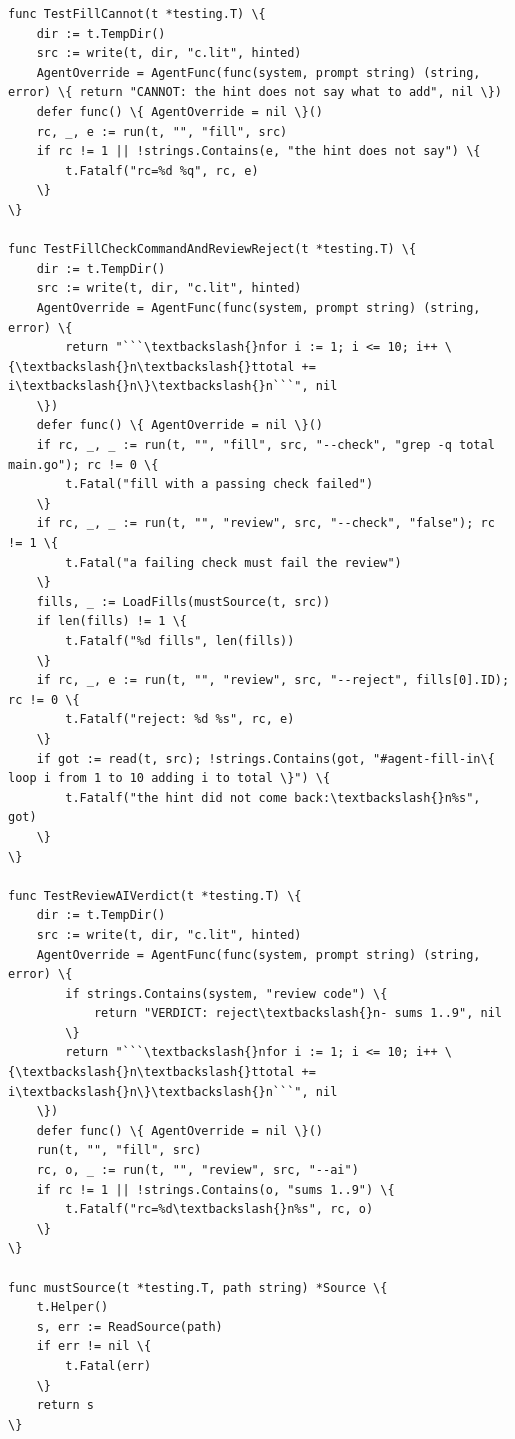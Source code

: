\documentclass[10pt,a4paper]{article}
\begin{document}
\begin{Verbatim}
func TestFillCannot(t *testing.T) \{
	dir := t.TempDir()
	src := write(t, dir, "c.lit", hinted)
	AgentOverride = AgentFunc(func(system, prompt string) (string, error) \{ return "CANNOT: the hint does not say what to add", nil \})
	defer func() \{ AgentOverride = nil \}()
	rc, _, e := run(t, "", "fill", src)
	if rc != 1 || !strings.Contains(e, "the hint does not say") \{
		t.Fatalf("rc=%d %q", rc, e)
	\}
\}

func TestFillCheckCommandAndReviewReject(t *testing.T) \{
	dir := t.TempDir()
	src := write(t, dir, "c.lit", hinted)
	AgentOverride = AgentFunc(func(system, prompt string) (string, error) \{
		return "```\textbackslash{}nfor i := 1; i <= 10; i++ \{\textbackslash{}n\textbackslash{}ttotal += i\textbackslash{}n\}\textbackslash{}n```", nil
	\})
	defer func() \{ AgentOverride = nil \}()
	if rc, _, _ := run(t, "", "fill", src, "--check", "grep -q total main.go"); rc != 0 \{
		t.Fatal("fill with a passing check failed")
	\}
	if rc, _, _ := run(t, "", "review", src, "--check", "false"); rc != 1 \{
		t.Fatal("a failing check must fail the review")
	\}
	fills, _ := LoadFills(mustSource(t, src))
	if len(fills) != 1 \{
		t.Fatalf("%d fills", len(fills))
	\}
	if rc, _, e := run(t, "", "review", src, "--reject", fills[0].ID); rc != 0 \{
		t.Fatalf("reject: %d %s", rc, e)
	\}
	if got := read(t, src); !strings.Contains(got, "#agent-fill-in\{ loop i from 1 to 10 adding i to total \}") \{
		t.Fatalf("the hint did not come back:\textbackslash{}n%s", got)
	\}
\}

func TestReviewAIVerdict(t *testing.T) \{
	dir := t.TempDir()
	src := write(t, dir, "c.lit", hinted)
	AgentOverride = AgentFunc(func(system, prompt string) (string, error) \{
		if strings.Contains(system, "review code") \{
			return "VERDICT: reject\textbackslash{}n- sums 1..9", nil
		\}
		return "```\textbackslash{}nfor i := 1; i <= 10; i++ \{\textbackslash{}n\textbackslash{}ttotal += i\textbackslash{}n\}\textbackslash{}n```", nil
	\})
	defer func() \{ AgentOverride = nil \}()
	run(t, "", "fill", src)
	rc, o, _ := run(t, "", "review", src, "--ai")
	if rc != 1 || !strings.Contains(o, "sums 1..9") \{
		t.Fatalf("rc=%d\textbackslash{}n%s", rc, o)
	\}
\}

func mustSource(t *testing.T, path string) *Source \{
	t.Helper()
	s, err := ReadSource(path)
	if err != nil \{
		t.Fatal(err)
	\}
	return s
\}
\end{Verbatim}
\end{document}
